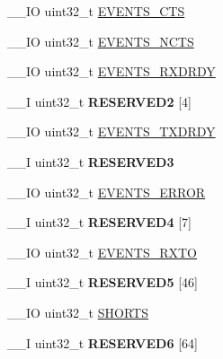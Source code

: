 \begin{DoxyCompactItemize}
\item 
\+\_\+\+\_\+\+I\+O uint32\+\_\+t \hyperlink{struct_n_r_f___u_a_r_t___type_a43541089a533517eb3a369baf7bac6f9}{E\+V\+E\+N\+T\+S\+\_\+\+C\+T\+S}
\item 
\+\_\+\+\_\+\+I\+O uint32\+\_\+t \hyperlink{struct_n_r_f___u_a_r_t___type_a29384985acf8821880037c6613fc934e}{E\+V\+E\+N\+T\+S\+\_\+\+N\+C\+T\+S}
\item 
\+\_\+\+\_\+\+I\+O uint32\+\_\+t \hyperlink{struct_n_r_f___u_a_r_t___type_af08b97b55571d9318a6f6f129a0321af}{E\+V\+E\+N\+T\+S\+\_\+\+R\+X\+D\+R\+D\+Y}
\item 
\hypertarget{struct_n_r_f___u_a_r_t___type_a72ec018b6d18480c2662dfac25946e44}{}\+\_\+\+\_\+\+I uint32\+\_\+t {\bfseries R\+E\+S\+E\+R\+V\+E\+D2} \mbox{[}4\mbox{]}\label{struct_n_r_f___u_a_r_t___type_a72ec018b6d18480c2662dfac25946e44}

\item 
\+\_\+\+\_\+\+I\+O uint32\+\_\+t \hyperlink{struct_n_r_f___u_a_r_t___type_ad9faf247786dbaf196319630d27cdedb}{E\+V\+E\+N\+T\+S\+\_\+\+T\+X\+D\+R\+D\+Y}
\item 
\hypertarget{struct_n_r_f___u_a_r_t___type_a4de8cadab0598502f4e5443412b21c29}{}\+\_\+\+\_\+\+I uint32\+\_\+t {\bfseries R\+E\+S\+E\+R\+V\+E\+D3}\label{struct_n_r_f___u_a_r_t___type_a4de8cadab0598502f4e5443412b21c29}

\item 
\+\_\+\+\_\+\+I\+O uint32\+\_\+t \hyperlink{struct_n_r_f___u_a_r_t___type_aa22f575c3ea42fa5bcb10d865dddd3e2}{E\+V\+E\+N\+T\+S\+\_\+\+E\+R\+R\+O\+R}
\item 
\hypertarget{struct_n_r_f___u_a_r_t___type_a9bdb13255c3b76c5eb269107198ca3fb}{}\+\_\+\+\_\+\+I uint32\+\_\+t {\bfseries R\+E\+S\+E\+R\+V\+E\+D4} \mbox{[}7\mbox{]}\label{struct_n_r_f___u_a_r_t___type_a9bdb13255c3b76c5eb269107198ca3fb}

\item 
\+\_\+\+\_\+\+I\+O uint32\+\_\+t \hyperlink{struct_n_r_f___u_a_r_t___type_ab9a37c232e65b1e9bd126a0c853c70a1}{E\+V\+E\+N\+T\+S\+\_\+\+R\+X\+T\+O}
\item 
\hypertarget{struct_n_r_f___u_a_r_t___type_a107ad2c0659b6ad773dfe748a6a38cc0}{}\+\_\+\+\_\+\+I uint32\+\_\+t {\bfseries R\+E\+S\+E\+R\+V\+E\+D5} \mbox{[}46\mbox{]}\label{struct_n_r_f___u_a_r_t___type_a107ad2c0659b6ad773dfe748a6a38cc0}

\item 
\+\_\+\+\_\+\+I\+O uint32\+\_\+t \hyperlink{struct_n_r_f___u_a_r_t___type_a1a1c1d51ab52e0900717e5694a306456}{S\+H\+O\+R\+T\+S}
\item 
\hypertarget{struct_n_r_f___u_a_r_t___type_a8c7e28e0e3dde6a901c40c6795180449}{}\+\_\+\+\_\+\+I uint32\+\_\+t {\bfseries R\+E\+S\+E\+R\+V\+E\+D6} \mbox{[}64\mbox{]}\label{struct_n_r_f___u_a_r_t___type_a8c7e28e0e3dde6a901c40c6795180449}


\end{DoxyCompactItemize}
